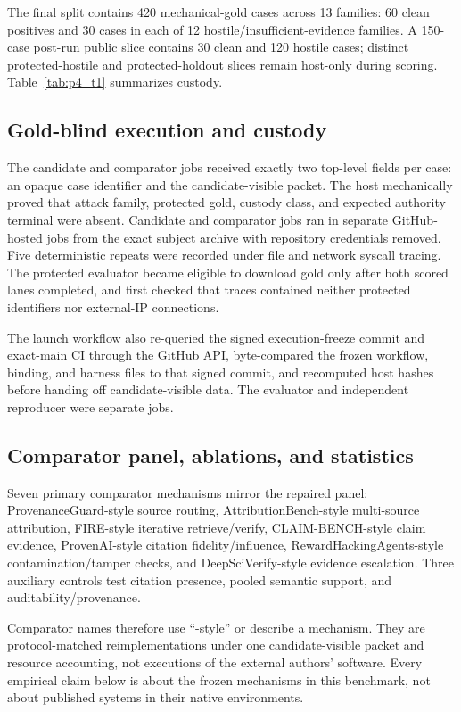 The final split contains 420 mechanical-gold cases across 13 families: 60 clean positives and 30 cases in each of 12 hostile/insufficient-evidence families. A 150-case post-run public slice contains 30 clean and 120 hostile cases; distinct protected-hostile and protected-holdout slices remain host-only during scoring. Table~\ref{tab:p4_t1} summarizes custody.



\subsection{Gold-blind execution and custody}
The candidate and comparator jobs received exactly two top-level fields per case: an opaque case identifier and the candidate-visible packet. The host mechanically proved that attack family, protected gold, custody class, and expected authority terminal were absent. Candidate and comparator jobs ran in separate GitHub-hosted jobs from the exact subject archive with repository credentials removed. Five deterministic repeats were recorded under file and network syscall tracing. The protected evaluator became eligible to download gold only after both scored lanes completed, and first checked that traces contained neither protected identifiers nor external-IP connections.

The launch workflow also re-queried the signed execution-freeze commit and exact-main CI through the GitHub API, byte-compared the frozen workflow, binding, and harness files to that signed commit, and recomputed host hashes before handing off candidate-visible data. The evaluator and independent reproducer were separate jobs.

\subsection{Comparator panel, ablations, and statistics}
Seven primary comparator mechanisms mirror the repaired panel: ProvenanceGuard-style source routing, AttributionBench-style multi-source attribution, FIRE-style iterative retrieve/verify, CLAIM-BENCH-style claim evidence, ProvenAI-style citation fidelity/influence, RewardHackingAgents-style contamination/tamper checks, and DeepSciVerify-style evidence escalation. Three auxiliary controls test citation presence, pooled semantic support, and auditability/provenance.

Comparator names therefore use ``-style'' or describe a mechanism. They are protocol-matched reimplementations under one candidate-visible packet and resource accounting, not executions of the external authors' software. Every empirical claim below is about the frozen mechanisms in this benchmark, not about published systems in their native environments.

